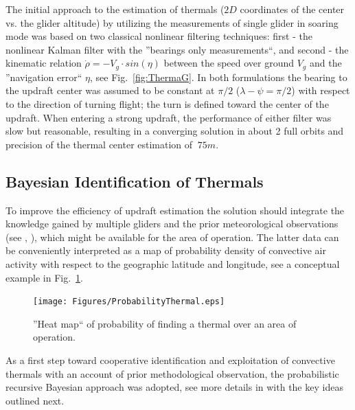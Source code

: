 \documentclass{ifacconf}
\newcommand{\squeezeup}{\vspace{-3.0mm}}
\begin{document}
The initial approach to the estimation of thermals ($2D$ coordinates of the
center vs. the glider altitude) by utilizing the measurements of single
glider in soaring mode was based on two classical nonlinear filtering
techniques: first - the nonlinear Kalman filter with the ''bearings only
measurements``, and second - the kinematic relation $\dot{\rho}=-V_g\cdot
sin(\eta)$ between the speed over ground $V_g$ and the ''navigation error``
$\eta$, see Fig.~\ref{fig:ThermaG}. In both formulations the bearing to the
updraft center was assumed to be constant at $\pi/2$ ($\lambda-\psi=\pi/2$)
with respect to the direction of turning flight; the turn is defined toward
the center of the updraft. When entering a strong updraft, the performance of
either filter was slow but reasonable, resulting in a converging solution in
about 2 full orbits and precision of the thermal center estimation of
$~75m$.\squeezeup
%

\subsection{Bayesian Identification of Thermals}
\label{subsec:BayesianMapping}
\squeezeup

To improve the efficiency of updraft estimation the solution should integrate
the knowledge gained by multiple gliders and the prior meteorological
observations (see \cite{Pennycuick:1998}, \cite{Hindman:2007}), which might
be available for the area of operation. The latter data can be conveniently
interpreted as a map of probability density of convective air activity with
respect to the geographic latitude and longitude, see a conceptual example in
Fig.~\ref{fig:HeatMap}.
\begin{figure}[thpb]
  \centering
  \texttt{[image: Figures/ProbabilityThermal.eps]}
  \caption{''Heat map`` of probability of finding a thermal over an area of operation.}
  \label{fig:HeatMap}
\end{figure}
As a first step toward cooperative identification and exploitation of
convective thermals with an account of prior methodological observation, the
probabilistic recursive Bayesian approach was adopted, see more details in
\cite{Bergman:1999} with the key ideas outlined next.
\end{document}
